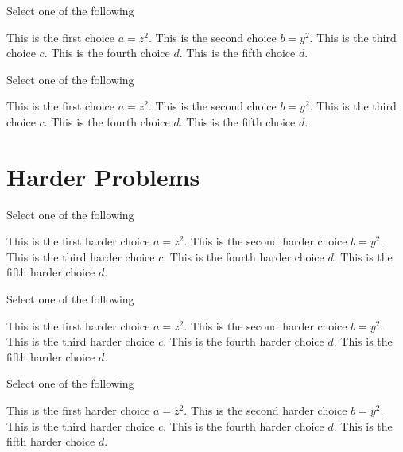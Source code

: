 \begin{problem}[Pickone II]
Select one of the following
\begin{pickone}[20]
\choice This is the first choice $a = z^2$.
\choice This is the second choice $b = y^2$.
\correctchoice This is the third choice $c$.
\correctchoice This is the fourth choice $d$.
\choice This is the fifth choice $d$.
\end{pickone}
\end{problem}

\begin{problem}
Select one of the following
\begin{pickone}[30]
\choice This is the first choice $a = z^2$.
\choice This is the second choice $b = y^2$.
\correctchoice This is the third choice $c$.
\correctchoice This is the fourth choice $d$.
\choice This is the fifth choice $d$.
\end{pickone}
\end{problem}


\section{Harder Problems}

\begin{problem}
Select one of the following
\begin{pickone}[40]
\choice This is the first harder choice $a = z^2$.
\choice This is the second harder choice $b = y^2$.
\correctchoice This is the third harder choice $c$.
\correctchoice This is the fourth harder choice $d$.
\choice This is the fifth harder choice $d$.
\end{pickone}
\end{problem}


\begin{problem}
Select one of the following
\begin{pickone}[50]
\choice This is the first harder choice $a = z^2$.
\choice This is the second harder choice $b = y^2$.
\correctchoice This is the third harder choice $c$.
\correctchoice This is the fourth harder choice $d$.
\choice This is the fifth harder choice $d$.
\end{pickone}
\end{problem}

\begin{problem}
Select one of the following
\begin{pickone}[60]
\choice This is the first harder choice $a = z^2$.
\choice This is the second harder choice $b = y^2$.
\correctchoice This is the third harder choice $c$.
\correctchoice This is the fourth harder choice $d$.
\choice This is the fifth harder choice $d$.
\end{pickone}
\end{problem}

